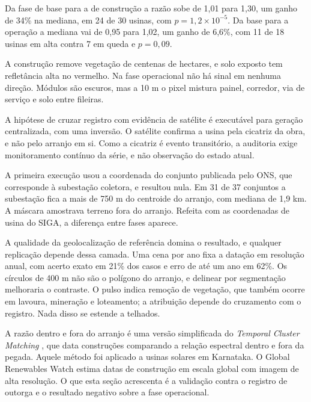 Da fase de base para a de construção a razão sobe de 1,01 para 1,30, um ganho de
34\% na mediana, em 24 de 30 usinas, com $p = 1{,}2 \times 10^{-5}$. Da base
para a operação a mediana vai de 0,95 para 1,02, um ganho de 6,6\%, com 11 de 18
usinas em alta contra 7 em queda e $p = 0{,}09$.


A construção remove vegetação de centenas de hectares, e solo exposto tem
refletância alta no vermelho. Na fase operacional não há sinal em nenhuma
direção. Módulos são escuros, mas a 10 m o pixel mistura painel, corredor, via
de serviço e solo entre fileiras.

 A hipótese de cruzar registro
com evidência de satélite é executável para geração centralizada, com uma
inversão. O satélite confirma a usina pela cicatriz da obra, e não pelo arranjo
em si. Como a cicatriz é evento transitório, a auditoria exige monitoramento
contínuo da série, e não observação do estado atual.

 A primeira execução usou a
coordenada do conjunto publicada pelo ONS, que corresponde à subestação
coletora, e resultou nula. Em 31 de 37 conjuntos a subestação fica a mais de
750 m do centroide do arranjo, com mediana de 1,9 km. A máscara amostrava
terreno fora do arranjo. Refeita com as coordenadas de usina do SIGA, a
diferença entre fases aparece.

\begin{objecao}
A qualidade da geolocalização de referência domina o resultado, e qualquer
replicação depende dessa camada. Uma cena por ano fixa a datação em resolução
anual, com acerto exato em 21\% dos casos e erro de até um ano em 62\%. Os
círculos de 400 m não são o polígono do arranjo, e delinear por segmentação
melhoraria o contraste. O pulso indica remoção de vegetação, que também ocorre
em lavoura, mineração e loteamento; a atribuição depende do cruzamento com o
registro. Nada disso se estende a telhados.
\end{objecao}

 A razão dentro e fora do arranjo é uma versão
simplificada do \textit{Temporal Cluster Matching} \cite{robinson2021}, que data
construções comparando a relação espectral dentro e fora da pegada. Aquele
método foi aplicado a usinas solares em Karnataka. O Global Renewables Watch
\cite{grw2025} estima datas de construção em escala global com imagem de alta
resolução. O que esta seção acrescenta é a validação contra o registro de
outorga e o resultado negativo sobre a fase operacional.

